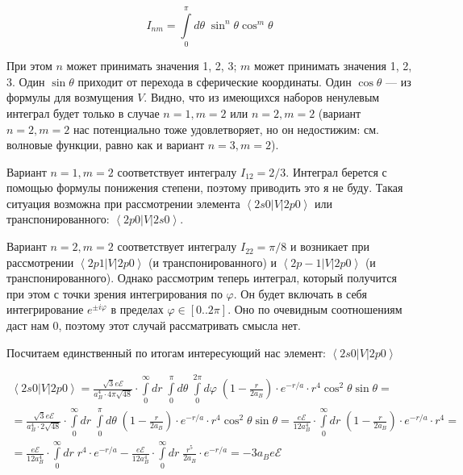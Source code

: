 \documentclass[a4paper, 12pt]{article}
\renewcommand{\phi}{\varphi} %
\newcommand{\bra}[1]
{\ensuremath{\left\langle#1\right|}}
\newcommand{\cat}[1]
{\ensuremath{\left|#1\right\rangle}}
\begin{document}
\begin{equation}
	I_{nm} = \int\limits_0^\pi d\theta\; \sin^n\theta \cos^m\theta
\end{equation}

При этом $n$ может принимать значения 1, 2, 3; $m$ может принимать значения 1, 2, 3. Один $\sin\theta$ приходит от перехода в сферические координаты. Один $\cos\theta$ --- из формулы для возмущения $V$. Видно, что из имеющихся наборов ненулевым интеграл будет только в случае $n=1, m=2$ или $n=2, m=2$ (вариант $n=2, m=2$ нас потенциально тоже удовлетворяет, но он недостижим: см. волновые функции, равно как и вариант $n=3, m=2$).

Вариант $n=1, m=2$ соответствует интегралу $I_{12} = 2/3$. Интеграл берется с помощью формулы понижения степени, поэтому приводить это я не буду. Такая ситуация возможна при рассмотрении элемента $\bra{2s0}V\cat{2p0}$ или транспонированного: $\bra{2p0}V\cat{2s0}$.

Вариант $n=2, m=2$ соответствует интегралу $I_{22} = \pi / 8$ и возникает при рассмотрении $\bra{2p1}V\cat{2p0}$ (и транспонированного) и $\bra{2p-1}V\cat{2p0}$ (и транспонированного). Однако рассмотрим теперь интеграл, который получится при этом с точки зрения интегрирования по $\phi$. Он будет включать в себя интегрирование $e^{\pm i\phi}$ в пределах $\phi \in [0..2\pi]$. Оно по очевидным соотношениям даст нам 0, поэтому этот случай рассматривать смысла нет.

Посчитаем единственный по итогам интересующий нас элемент: $\bra{2s0}V\cat{2p0}$

\begin{align*}
	\bra{2s0}V\cat{2p0} = \frac{\sqrt{3} e \mathcal{E}}{a_B^4 \cdot 4 \pi \sqrt{48}} \cdot \int\limits_0^\infty dr \; \int\limits_0^\pi d\theta \; \int\limits_0^{2\pi} d\phi \; \left(1 - \frac{r}{2a_B}\right) \cdot e^{-r/a} \cdot r^4 \cos^2\theta \sin\theta = \\
	= \frac{\sqrt{3}e \mathcal{E}}{a_B^4 \cdot 2 \sqrt{48}} \cdot \int\limits_0^\infty dr \; \int\limits_0^\pi d\theta \; \left(1 - \frac{r}{2a_B}\right) \cdot e^{-r/a} \cdot r^4 \cos^2\theta \sin\theta = \frac{e \mathcal{E}}{12a_B^4} \cdot \int\limits_0^\infty dr \; \left(1 - \frac{r}{2a_B}\right) \cdot e^{-r/a} \cdot r^4 = \\
	= \frac{e \mathcal{E}}{12a_B^4} \cdot \int\limits_0^\infty dr \; r^4 \cdot e^{-r/a} - \frac{e \mathcal{E}}{12a_B^4} \cdot \int\limits_0^\infty dr \;\frac{r^5}{2a_B} \cdot e^{-r/a} = -3a_B e \mathcal{E}
\end{align*}
\end{document}
